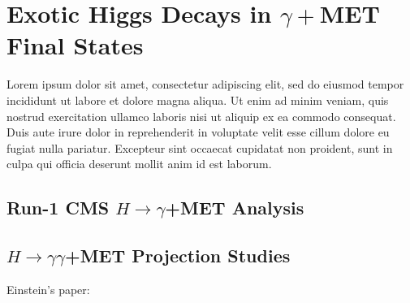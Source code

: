 \chapter{Exotic Higgs Decays in $\gamma+$MET Final States}

Lorem ipsum dolor sit amet, consectetur adipiscing elit, sed do eiusmod tempor incididunt ut labore et dolore magna aliqua. Ut enim ad minim veniam, quis nostrud exercitation ullamco laboris nisi ut aliquip ex ea commodo consequat. Duis aute irure dolor in reprehenderit in voluptate velit esse cillum dolore eu fugiat nulla pariatur. Excepteur sint occaecat cupidatat non proident, sunt in culpa qui officia deserunt mollit anim id est laborum.
\section{Run-1 CMS $H\rightarrow\gamma$+MET Analysis}
\section{$H\rightarrow\gamma\gamma$+MET Projection Studies}
Einstein's paper: \cite{Einstein}
